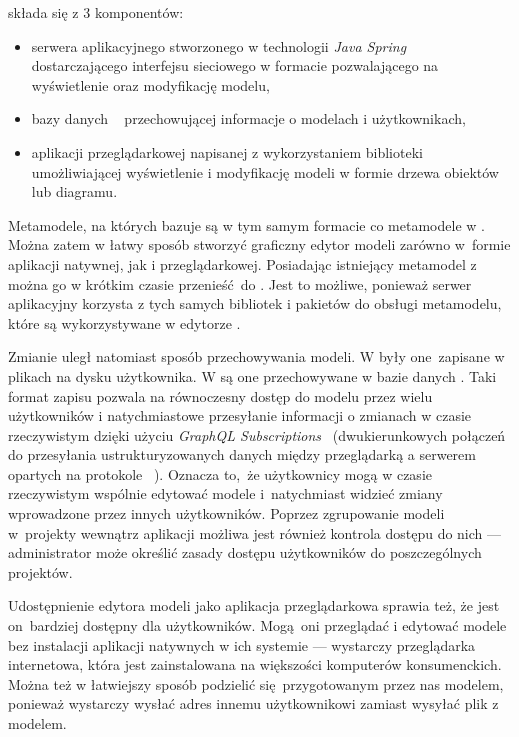 \SiriusWeb{} składa się z 3 komponentów:

\begin{itemize}
	\item serwera aplikacyjnego stworzonego w technologii \emph{Java
		      Spring}~\cite{java-spring-homepage} dostarczającego interfejsu sieciowego  w formacie \GraphQL{} pozwalającego na wyświetlenie oraz modyfikację modelu,
	\item bazy danych \PostgreSQL{}~\cite{postgresql-homepage} przechowującej informacje o modelach i użytkownikach,
	\item aplikacji przeglądarkowej napisanej z wykorzystaniem biblioteki \React{}~\cite{react-homepage} umożliwiającej wyświetlenie i modyfikację modeli w formie drzewa obiektów lub diagramu.
\end{itemize}

Metamodele, na których bazuje \SiriusWeb{} są w tym samym formacie \EMF{} co
metamodele w \SiriusDesktop{}. Można zatem w łatwy sposób stworzyć
graficzny edytor modeli zarówno w~formie aplikacji natywnej, jak i
przeglądarkowej. Posiadając istniejący metamodel 
z~\SiriusDesktop{} można go w krótkim czasie przenieść do \SiriusWeb{}. Jest
to
możliwe, ponieważ serwer aplikacyjny korzysta z tych samych bibliotek i
pakietów do obsługi metamodelu, które są wykorzystywane w edytorze
\SiriusDesktop{}.

Zmianie uległ natomiast sposób przechowywania modeli. W \SiriusDesktop{}
były one~zapisane w plikach na dysku użytkownika. W \SiriusWeb{} są one
przechowywane w bazie danych \PostgreSQL{}. Taki format zapisu pozwala na
równoczesny dostęp do modelu przez wielu użytkowników i natychmiastowe
przesyłanie informacji o zmianach w czasie rzeczywistym dzięki użyciu
\emph{GraphQL Subscriptions}~\cite{graphql-subscriptions} (dwukierunkowych
połączeń do przesyłania ustrukturyzowanych danych między przeglądarką a
serwerem opartych na protokole \WebSocket{}~\cite{wikipedia-websocket}).
Oznacza to, że użytkownicy mogą w czasie rzeczywistym wspólnie edytować modele
i~natychmiast widzieć zmiany wprowadzone przez innych użytkowników.
Poprzez zgrupowanie modeli w~projekty wewnątrz aplikacji \SiriusWeb{}
możliwa jest również kontrola dostępu do nich --- administrator może określić
zasady dostępu użytkowników do poszczególnych projektów.

Udostępnienie edytora modeli jako aplikacja przeglądarkowa sprawia też, że jest
on~bardziej dostępny dla użytkowników. Mogą oni przeglądać i edytować modele
bez instalacji aplikacji natywnych w ich systemie --- wystarczy przeglądarka
internetowa, która jest zainstalowana na większości komputerów konsumenckich.
Można też w łatwiejszy sposób podzielić się~przygotowanym przez nas modelem,
ponieważ wystarczy wysłać adres  innemu użytkownikowi zamiast
wysyłać plik z modelem.

